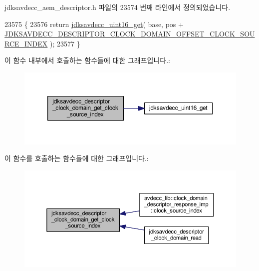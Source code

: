jdksavdecc\+\_\+aem\+\_\+descriptor.\+h 파일의 23574 번째 라인에서 정의되었습니다.


\begin{DoxyCode}
23575 \{
23576     \textcolor{keywordflow}{return} \hyperlink{group__endian_ga3fbbbc20be954aa61e039872965b0dc9}{jdksavdecc\_uint16\_get}( base, pos + 
      \hyperlink{group__descriptor__clock__domain_ga87ccb2a813c16fd3fd527f0ad1005611}{JDKSAVDECC\_DESCRIPTOR\_CLOCK\_DOMAIN\_OFFSET\_CLOCK\_SOURCE\_INDEX}
       );
23577 \}
\end{DoxyCode}


이 함수 내부에서 호출하는 함수들에 대한 그래프입니다.\+:
\nopagebreak
\begin{figure}[H]
\begin{center}
\leavevmode
\includegraphics[width=350pt]{group__descriptor__clock__domain_ga6a4c7b063da71aff1fe21915bd739d5e_cgraph}
\end{center}
\end{figure}




이 함수를 호출하는 함수들에 대한 그래프입니다.\+:
\nopagebreak
\begin{figure}[H]
\begin{center}
\leavevmode
\includegraphics[width=350pt]{group__descriptor__clock__domain_ga6a4c7b063da71aff1fe21915bd739d5e_icgraph}
\end{center}
\end{figure}


